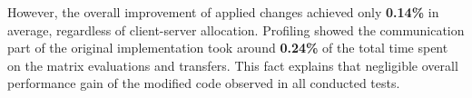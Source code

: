 However, the overall improvement of applied changes achieved only \textbf{0.14\%} in average, regardless of client-server allocation. Profiling showed the communication part of the original implementation took around \textbf{0.24\%} of the total time spent on the matrix evaluations and transfers. This fact explains that negligible overall performance gain of the modified code observed in all conducted tests.\\